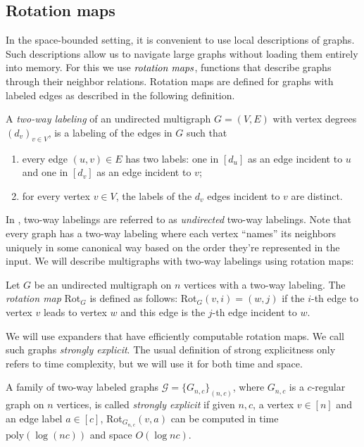 \documentclass{toc}
\numberwithin{myalgctr}{section}
\theoremstyle{named}
\begin{document}
\subsection{Rotation maps}
In the space-bounded setting, it is convenient to use local descriptions of graphs. Such descriptions allow us to navigate large graphs without loading them entirely into memory. For this we use $\emph{rotation maps}$, functions that describe graphs through their neighbor relations. Rotation maps are defined for graphs with labeled edges as described in the following definition.

\begin{definition}
\label{def:labeling}
A \emph{two-way labeling} of an undirected multigraph $G=(V,E)$ with vertex degrees $(d_v)_{v\in V}$, is a labeling of the edges in $G$ such that 
\begin{enumerate}
\item every edge $(u,v)\in E$ has two labels: one in $[d_u]$ as an edge incident to $u$ and one in $[d_v]$ as an edge incident to $v$;
\item for every vertex $v\in V$, the labels of the $d_v$ edges incident to $v$ are distinct.
\end{enumerate}
\end{definition}
In \cite{RozenmanVa05}, two-way labelings are referred to as \emph{undirected} two-way labelings. Note that every graph has a two-way labeling where each vertex ``names'' its neighbors uniquely in some canonical way based on the order they're represented in the input. We will describe multigraphs with two-way labelings using rotation maps:

\begin{definition}
\label{def:rotmap}
Let $G$ be an undirected multigraph on $n$ vertices with a two-way labeling. The \emph{rotation map} Rot$_{G}$ is defined as follows: Rot$_{G}(v,i)=(w,j)$ if the $i$-th edge to vertex $v$ leads to vertex $w$ and this edge is the $j$-th edge incident to $w$. 
\end{definition}

We will use expanders that have efficiently computable rotation maps. We call such graphs \emph{strongly explicit}. The usual definition of strong explicitness only refers to time complexity, but we will use it for both time and space. 
\begin{definition}
A family of two-way labeled graphs $\mathcal{G}=\{G_{n,c}\}_{(n,c)}$, where $G_{n,c}$ is a $c$-regular graph on $n$ vertices, is called \emph{strongly explicit} if given $n,c$, a vertex $v\in[n]$ and an edge label $a\in[c]$, Rot$_{G_{n,c}}(v,a)$ can be computed in time $\mathrm{poly}(\log (nc))$ and space $O(\log nc)$.
\end{definition}
\end{document}
